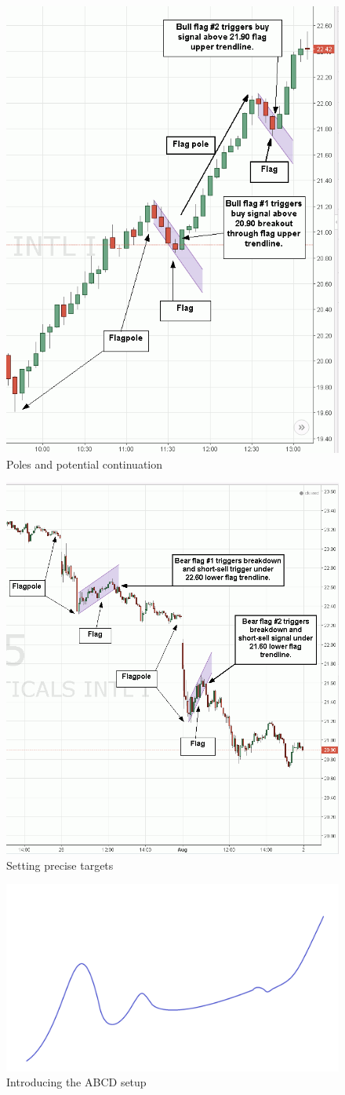 \documentclass{article}
\begin{document}
\begin{figure}[!htb]
    \centering
    \includegraphics[width=.5\textwidth]{imgs/54.png}
    \caption{Poles and potential continuation}
\end{figure}

\vspace{10pt}

\begin{figure}[!htb]
    \centering
    \includegraphics[width=.6\textwidth]{imgs/55.png}
    \caption{Setting precise targets}
\end{figure}

\vspace{10pt}

\begin{figure}[!htb]
    \centering
    \includegraphics[width=\textwidth]{imgs/56.png}
    \caption{Introducing the ABCD setup}
\end{figure}
\end{document}
